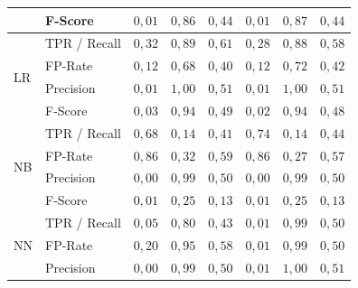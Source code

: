 \begin{table}
{\begin{tabular}{|ll|rrr|rrr|}
                     & F-Score      & $0,01$             & $0,86$                 & $0,44$                     & $0,01$             & $0,87$                 & $0,44$                      \\ 
\hline
\multirow{4}{*}{LR}  & TPR / Recall & $0,32$             & $0,89$                 & $0,61$                     & $0,28$             & $0,88$                 & $0,58$                      \\
                     & FP-Rate      & $0,12$             & $0,68$                 & $0,40$                     & $0,12$             & $0,72$                 & $0,42$                      \\
                     & Precision    & $0,01$             & $1,00$                 & $0,51$                     & $0,01$             & $1,00$                 & $0,51$                      \\
                     & F-Score      & $0,03$             & $0,94$                 & $0,49$                     & $0,02$             & $0,94$                 & $0,48$                      \\ 
\hline
\multirow{4}{*}{NB}  & TPR / Recall & $0,68$             & $0,14$                 & $0,41$                     & $0,74$             & $0,14$                 & $0,44$                      \\
                     & FP-Rate      & $0,86$             & $0,32$                 & $0,59$                     & $0,86$             & $0,27$                 & $0,57$                      \\
                     & Precision    & $0,00$             & $0,99$                 & $0,50$                     & $0,00$             & $0,99$                 & $0,50$                      \\
                     & F-Score      & $0,01$             & $0,25$                 & $0,13$                     & $0,01$             & $0,25$                 & $0,13$                      \\ 
\hline
\multirow{4}{*}{NN}  & TPR / Recall & $0,05$             & $0,80$                 & $0,43$                     & $0,01$             & $0,99$                 & $0,50$                      \\
                     & FP-Rate      & $0,20$             & $0,95$                 & $0,58$                     & $0,01$             & $0,99$                 & $0,50$                      \\
                     & Precision    & $0,00$             & $0,99$                 & $0,50$                     & $0,01$             & $1,00$                 & $0,51$                      \\

\end{tabular}}
\end{table}
